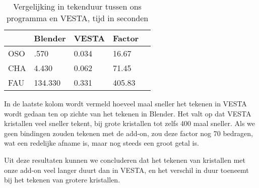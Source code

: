 \begin{table}[H]
\caption{Vergelijking in tekenduur tussen ons programma en VESTA, tijd in seconden}
\begin{center}
\begin{tabular}{|l|l|l|l|l|}
\hline
			              & Blender    	& VESTA & Factor \\ \hline
\multicolumn{1}{|l|}{OSO} & .570    	& 0.034 & 16.67  \\ \hline
\multicolumn{1}{|l|}{CHA} & 4.430   	& 0.062 & 71.45  \\ \hline
\multicolumn{1}{|l|}{FAU} & 134.330 	& 0.331 & 405.83 \\ \hline
\end{tabular}
\end{center}
\end{table}
In de laatste kolom wordt vermeld hoeveel maal sneller het tekenen in VESTA wordt gedaan ten op zichte van het tekenen in Blender. Het valt op dat VESTA kristallen veel sneller tekent, bij grote kristallen tot zelfs 400 maal sneller. Als we geen bindingen zouden tekenen met de add-on, zou deze factor nog 70 bedragen, wat een redelijke afname is, maar nog steeds een groot getal is. 
\par
Uit deze resultaten kunnen we concluderen dat het tekenen van kristallen met onze add-on veel langer duurt dan in VESTA, en het verschil in duur toeneemt bij het tekenen van grotere kristallen.  

